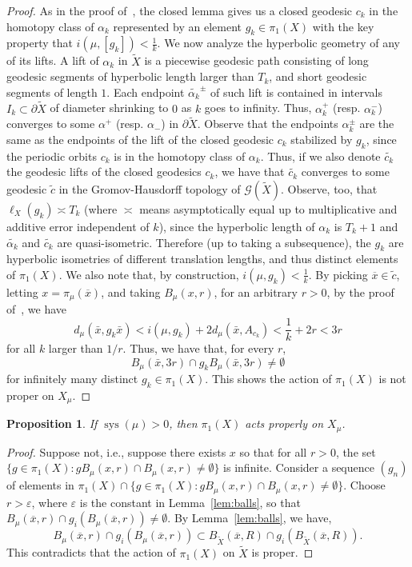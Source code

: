 \documentclass[12pt,article]{amsart}
\numberwithin{equation}{section}
\numberwithin{figure}{section}
\newtheorem{proposition}[equation]{Proposition}
\theoremstyle{definition}
\theoremstyle{plain}
\DeclareMathOperator{\sys}{sys}
\newcommand*{\wt}[1]{\widetilde{#1}}
\renewcommand{\epsilon}{\varepsilon}
\begin{document}
\begin{proof}
As in the proof of~\cite[Proposition~5.1]{BIPP21:Currents}, the closed lemma gives us a closed geodesic $c_k$ in the homotopy class of $\alpha_k$ represented by an element $g_k \in \pi_1(X)$ with the key property that $i(\mu, [g_k])< \frac{1}{k}$. We now analyze the hyperbolic geometry of any of its lifts.
A lift of $\alpha_k$ in $\wt{X}$ is a piecewise geodesic path consisting of long geodesic segments of hyperbolic length larger than $T_k$, and short geodesic segments of length $1$. 
Each endpoint $\wt{\alpha_k}^{\pm}$ of such lift is contained in intervals $I_k \subset \partial \wt{X}$ of diameter shrinking to $0$ as $k$ goes to infinity. Thus, $\alpha_k^+$ (resp. $\alpha_k^-$) converges to some $\alpha^+$ (resp. $\alpha_-$) in $\partial \wt{X}$.
Observe that the endpoints $\alpha_k^{\pm}$ are the same as the endpoints of the lift of the closed geodesic $c_k$ stabilized by $g_k$, since the periodic orbits $c_k$ is in the homotopy class of $\alpha_k$.
Thus, if we also denote $\wt{c_k}$ the geodesic lifts of the closed geodesics $c_k$, we have that $\wt{c_k}$ converges to some geodesic $\wt{c}$ in the Gromov-Hausdorff topology of $\mathcal{G}(\wt{X})$.
Observe, too, that $\ell_X(g_k) \asymp T_k$ (where $\asymp$ means asymptotically equal up to multiplicative and additive error independent of $k$), since the hyperbolic length of $\alpha_k$ is $T_k + 1$ and $\wt{\alpha_k}$ and $\wt{c_k}$ are quasi-isometric. Therefore (up to taking a subsequence), the $g_k$ are hyperbolic isometries of different translation lengths, and thus distinct elements of $\pi_1(X)$.
We also note that, by construction, $i(\mu, g_k) < \frac{1}{k}$.
By picking $\overline{x} \in \wt{c}$,  letting $x=\pi_{\mu}(\overline{x})$, and taking $B_{\mu}(x, r)$, for an arbitrary $r>0$, by the proof of~\cite[Proposition~3.14]{MZ19:PositivelyRatioed}, we have
\[
d_{\mu}(\bar{x}, g_k \bar{x})  < i(\mu, g_k) + 2d_{\mu}(\bar{x},A_{c_k}) < \frac{1}{k} + 2r < 3r
\]
for all $k$ larger than $1/r$.
Thus, we have that, for every $r$,
\[
B_{\mu}(\bar{x},3r) \cap g_k B_{\mu}(\bar{x},3r) \neq \emptyset
\]
for infinitely many distinct $g_k \in \pi_1(X)$. This shows the action of $\pi_1(X)$ is not proper on $X_{\mu}$.
\end{proof}

\begin{proposition}
If $\sys(\mu)>0$, then $\pi_1(X)$ acts properly on $X_{\mu}$.
\label{prop:proper}
\end{proposition}
\begin{proof}
Suppose not, i.e., suppose there exists $x$ so that for all $r>0$, the set $\{ g\in \pi_1 (X) \colon g B_{\mu}(x,r) \cap B_{\mu}(x,r) \neq \emptyset \}$ is infinite. Consider a sequence $(g_n)$ of elements in $\pi_1(X) \cap \{ g\in \pi_1 (X) \colon g B_{\mu}(x,r) \cap B_{\mu}(x,r) \neq \emptyset \}$.
Choose $r>\epsilon$, where $\epsilon$ is the constant in Lemma~\ref{lem:balls}, so that $B_{\mu}(\overline{x},r) \cap g_i(B_{\mu}(\overline{x},r)) \neq \emptyset$. By Lemma~\ref{lem:balls}, we have,
\[
B_{\mu}(\overline{x},r) \cap g_i(B_{\mu}(\overline{x},r)) \subset B_{\wt{X}}(\overline{x},R) \cap g_i(B_{\wt{X}}(\overline{x},R)).
\]
This contradicts that the action of $\pi_1(X)$ on $\wt{X}$ is proper.
\end{proof}
\end{document}
